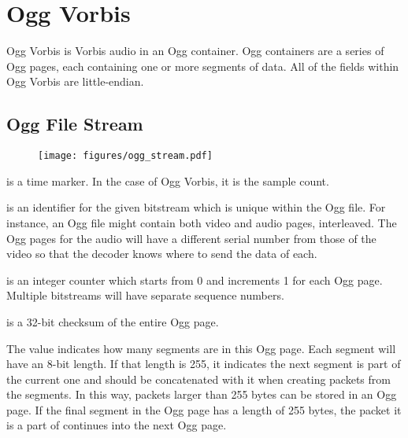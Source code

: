 
\chapter{Ogg Vorbis}
\label{vorbis}
Ogg Vorbis is Vorbis audio in an Ogg container.
Ogg containers are a series of Ogg pages, each containing
one or more segments of data.
All of the fields within Ogg Vorbis are little-endian.
\section{Ogg File Stream}
\begin{figure}[h]
\texttt{[image: figures/ogg\_stream.pdf]}
\end{figure}
 is a time marker.
In the case of Ogg Vorbis, it is the sample count.

 is an identifier for the given
bitstream which is unique within the Ogg file.
For instance, an Ogg file might contain both video and
audio pages, interleaved.
The Ogg pages for the audio will have a different
serial number from those of the video so that the decoder
knows where to send the data of each.

 is an integer counter which starts from 0
and increments 1 for each Ogg page.
Multiple bitstreams will have separate sequence numbers.

 is a 32-bit checksum of the entire Ogg page.

The  value indicates how many segments are in
this Ogg page.
Each segment will have an 8-bit length.
If that length is 255, it indicates the next segment is
part of the current one and should be concatenated with it when
creating packets from the segments.
In this way, packets larger than 255 bytes can be stored in
an Ogg page.
If the final segment in the Ogg page has a length of 255 bytes,
the packet it is a part of continues into the next Ogg page.

